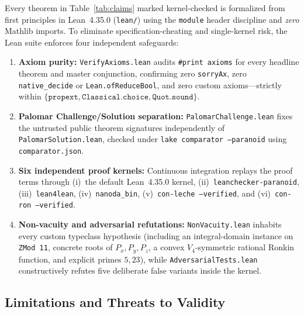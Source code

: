 \documentclass[11pt,reqno]{amsart}
\theoremstyle{definition}
\newcommand{\tierK}{\textsf{\scriptsize\textcolor{accentgreen}{kernel-checked}}}
\begin{document}
Every theorem in Table~\ref{tab:claims} marked \tierK{} is formalized from first principles in
Lean~4.35.0 (\texttt{lean/}) using the \texttt{module} header discipline and \emph{zero} Mathlib imports.
To eliminate specification-cheating and single-kernel risk, the Lean suite enforces four
independent safeguards:
\begin{enumerate}[leftmargin=2em]
  \item \textbf{Axiom purity:} \texttt{VerifyAxioms.lean} audits \texttt{\#print axioms} for every
    headline theorem and master conjunction, confirming zero \texttt{sorryAx}, zero
    \texttt{native\_decide} or \texttt{Lean.ofReduceBool}, and zero custom axioms---strictly within
    $\{\texttt{propext}, \texttt{Classical.choice}, \texttt{Quot.sound}\}$.
  \item \textbf{Palomar Challenge/Solution separation:} \texttt{PalomarChallenge.lean} fixes the
    untrusted public theorem signatures independently of \texttt{PalomarSolution.lean}, checked
    under \texttt{lake comparator --paranoid} using \texttt{comparator.json}.
  \item \textbf{Six independent proof kernels:} Continuous integration replays the proof terms
    through (i)~the default Lean~4.35.0 kernel, (ii)~\texttt{leanchecker-paranoid},
    (iii)~\texttt{lean4lean}, (iv)~\texttt{nanoda\_bin}, (v)~\texttt{con-leche --verified}, and
    (vi)~\texttt{con-ron --verified}.
  \item \textbf{Non-vacuity and adversarial refutations:} \texttt{NonVacuity.lean} inhabits every
    custom typeclass hypothesis (including an integral-domain instance on \texttt{ZMod 11},
    concrete roots of $P_x, P_y, P_z$, a convex $V_4$-symmetric rational Ronkin function, and
    explicit primes $5, 23$), while \texttt{AdversarialTests.lean} constructively refutes five
    deliberate false variants inside the kernel.
\end{enumerate}

\subsection{Limitations and Threats to Validity}
\end{document}
